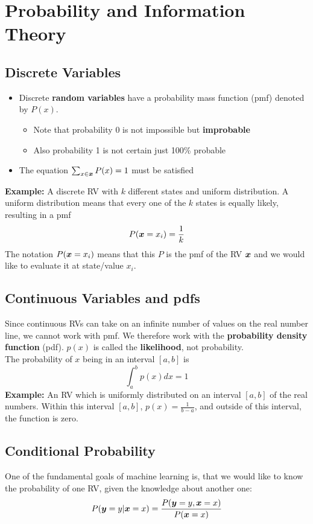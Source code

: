 \section{Probability and Information Theory}
\begin{multicols}{2}
	\subsection{Discrete Variables}
	\begin{itemize}
		\item Discrete \textbf{random variables} have a probability mass function (pmf) denoted by $P(x)$.
		\begin{itemize}
			\item Note that probability 0 is not impossible but \textbf{improbable}
			\item Also probability 1 is not certain just 100\% probable
		\end{itemize}
		\item The equation $ \sum_{x\in \bol{x}} P(x)=1$ must be satisfied
	\end{itemize}
	\textbf{Example:} A discrete RV with $k$ different states and uniform distribution.
	A uniform distribution means that every one of the $k$ states is equally likely, resulting in a pmf
	\[ P(\bol{x}=x_i)=\frac{1}{k} \]
	The notation $P(\bol{x}=x_i)$ means that this $P$ is the pmf of the RV $\bol{x}$ and we would like to evaluate it at state/value $x_i$.
	
	\subsection{Continuous Variables and pdfs}
	Since continuous RVs can take on an infinite number of values on the real number line, we cannot work with pmf.
	We therefore work with the \textbf{probability density function} (pdf).
	$p(x)$ is called the \textbf{likelihood}, not probability.\\
	
	The probability of $x$ being in an interval $\left[a,b\right]$ is
	\[ \int_a^b p(x)dx = 1 \]
	\textbf{Example:} An RV which is uniformly distributed on an interval $\left[a,b\right]$ of the real numbers.
	Within this interval $\left[a,b\right]$, $p(x)=\frac{1}{b-a}$, and outside of this interval, the function is zero.
	
	\subsection{Conditional Probability}
	One of the fundamental goals of machine learning is, that we would like to know the probability of one RV, given the knowledge about another one:
	\[ P(\bol{y}=y|\bol{x}=x)=\frac{P(\bol{y}=y,\bol{x}=x)}{P(\bol{x}=x)} \]
	

\end{multicols}
